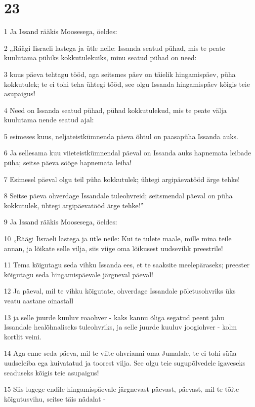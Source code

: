 \chapter{23}

\par 1 Ja Issand rääkis Moosesega, öeldes:
\par 2 „Räägi Iisraeli lastega ja ütle neile: Issanda seatud pühad, mis te peate kuulutama pühiks kokkutulekuiks, minu seatud pühad on need:
\par 3 kuus päeva tehtagu tööd, aga seitsmes päev on täielik hingamispäev, püha kokkutulek; te ei tohi teha ühtegi tööd, see olgu Issanda hingamispäev kõigis teie asupaigus!
\par 4 Need on Issanda seatud pühad, pühad kokkutulekud, mis te peate välja kuulutama nende seatud ajal:
\par 5 esimeses kuus, neljateistkümnenda päeva õhtul on paasapüha Issanda auks.
\par 6 Ja sellesama kuu viieteistkümnendal päeval on Issanda auks hapnemata leibade püha; seitse päeva sööge hapnemata leiba!
\par 7 Esimesel päeval olgu teil püha kokkutulek; ühtegi argipäevatööd ärge tehke!
\par 8 Seitse päeva ohverdage Issandale tuleohvreid; seitsmendal päeval on püha kokkutulek, ühtegi argipäevatööd ärge tehke!”
\par 9 Ja Issand rääkis Moosesega, öeldes:
\par 10 „Räägi Iisraeli lastega ja ütle neile: Kui te tulete maale, mille mina teile annan, ja lõikate selle vilja, siis viige oma lõikusest uudsevihk preestrile!
\par 11 Tema kõigutagu seda vihku Issanda ees, et te saaksite meelepäraseks; preester kõigutagu seda hingamispäevale järgneval päeval!
\par 12 Ja päeval, mil te vihku kõigutate, ohverdage Issandale põletusohvriks üks veatu aastane oinastall
\par 13 ja selle juurde kuuluv roaohver - kaks kannu õliga segatud peent jahu Issandale healõhnaliseks tuleohvriks, ja selle juurde kuuluv joogiohver - kolm kortlit veini.
\par 14 Aga enne seda päeva, mil te viite ohvrianni oma Jumalale, te ei tohi süüa uudseleiba ega kuivatatud ja toorest vilja. See olgu teie sugupõlvedele igaveseks seaduseks kõigis teie asupaigus!
\par 15 Siis lugege endile hingamispäevale järgnevast päevast, päevast, mil te tõite kõigutusvihu, seitse täis nädalat -

